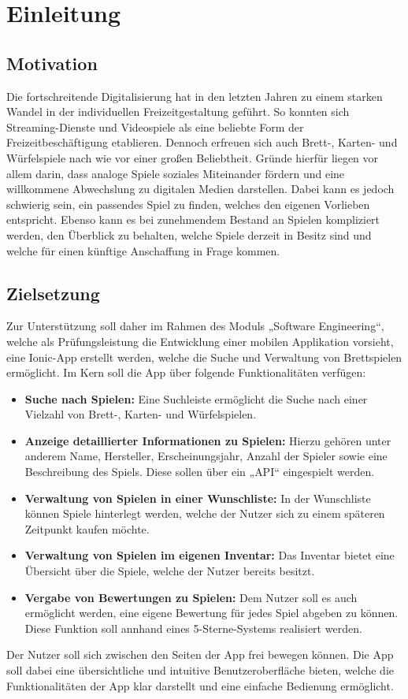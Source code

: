 \chapter{Einleitung}
\section{Motivation}
Die fortschreitende Digitalisierung hat in den letzten Jahren zu einem starken Wandel in der individuellen Freizeitgestaltung geführt. So konnten
sich Streaming-Dienste und Videospiele als eine beliebte Form der Freizeitbeschäftigung etablieren.
Dennoch erfreuen sich auch Brett-, Karten- und Würfelspiele nach wie vor einer großen Beliebtheit.
Gründe hierfür liegen vor allem darin, dass analoge Spiele soziales Miteinander fördern und eine willkommene Abwechslung zu digitalen Medien darstellen.
Dabei kann es jedoch schwierig sein, ein passendes Spiel zu finden, welches den eigenen Vorlieben entspricht.
Ebenso kann es bei zunehmendem Bestand an Spielen kompliziert werden, den Überblick zu behalten, welche Spiele
derzeit in Besitz sind und welche für einen künftige Anschaffung in Frage kommen.
\section{Zielsetzung}
Zur Unterstützung soll daher im Rahmen des Moduls „Software Engineering“, welche als Prüfungsleistung die Entwicklung einer mobilen Applikation vorsieht,
eine Ionic-App erstellt werden, welche die Suche und Verwaltung von Brettspielen ermöglicht. Im Kern soll die App über folgende
Funktionalitäten verfügen:
\begin{itemize}
    \item \textbf{Suche nach Spielen:} Eine Suchleiste ermöglicht die Suche nach einer Vielzahl von Brett-, Karten- und Würfelspielen. 
    \item \textbf{Anzeige detaillierter Informationen zu Spielen:} Hierzu gehören unter anderem Name, Hersteller, Erscheinungsjahr, Anzahl der Spieler sowie eine Beschreibung des Spiels. Diese sollen über ein „\ac{API}“ eingespielt werden.
    \item \textbf{Verwaltung von Spielen in einer Wunschliste:} In der Wunschliste können Spiele hinterlegt werden, welche der Nutzer sich zu einem späteren Zeitpunkt kaufen möchte.
    \item \textbf{Verwaltung von Spielen im eigenen Inventar:} Das Inventar bietet eine Übersicht über die Spiele, welche der Nutzer bereits besitzt.
    \item \textbf{Vergabe von Bewertungen zu Spielen:} Dem Nutzer soll es auch ermöglicht werden, eine eigene Bewertung für jedes Spiel abgeben zu können. Diese Funktion soll annhand eines 5-Sterne-Systems realisiert werden.
\end{itemize}
Der Nutzer soll sich zwischen den Seiten der App frei bewegen können. Die App soll dabei eine übersichtliche und intuitive Benutzeroberfläche bieten, welche die Funktionalitäten der App klar darstellt und eine einfache Bedienung ermöglicht.
